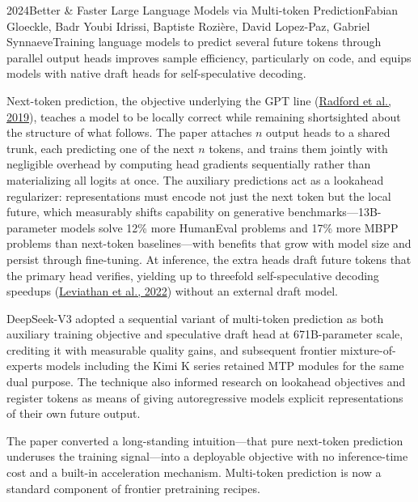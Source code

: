 
\begin{papersummary}{2024}{Better \& Faster Large Language Models via Multi-token Prediction}{Fabian Gloeckle, Badr Youbi Idrissi, Baptiste Rozi\`ere, David Lopez-Paz, Gabriel Synnaeve}{Training language models to predict several future tokens through parallel output heads improves sample efficiency, particularly on code, and equips models with native draft heads for self-speculative decoding.}

Next-token prediction, the objective underlying the GPT line (\hyperref[paper:radford-2019]{Radford et al., 2019}), teaches a model to be locally correct while remaining shortsighted about the structure of what follows. The paper attaches $n$ output heads to a shared trunk, each predicting one of the next $n$ tokens, and trains them jointly with negligible overhead by computing head gradients sequentially rather than materializing all logits at once. The auxiliary predictions act as a lookahead regularizer: representations must encode not just the next token but the local future, which measurably shifts capability on generative benchmarks---13B-parameter models solve 12\% more HumanEval problems and 17\% more MBPP problems than next-token baselines---with benefits that grow with model size and persist through fine-tuning. At inference, the extra heads draft future tokens that the primary head verifies, yielding up to threefold self-speculative decoding speedups (\hyperref[paper:leviathan-2022-speculative]{Leviathan et al., 2022}) without an external draft model.

DeepSeek-V3 adopted a sequential variant of multi-token prediction as both auxiliary training objective and speculative draft head at 671B-parameter scale, crediting it with measurable quality gains, and subsequent frontier mixture-of-experts models including the Kimi K series retained MTP modules for the same dual purpose. The technique also informed research on lookahead objectives and register tokens as means of giving autoregressive models explicit representations of their own future output.

The paper converted a long-standing intuition---that pure next-token prediction underuses the training signal---into a deployable objective with no inference-time cost and a built-in acceleration mechanism. Multi-token prediction is now a standard component of frontier pretraining recipes.

\end{papersummary}
